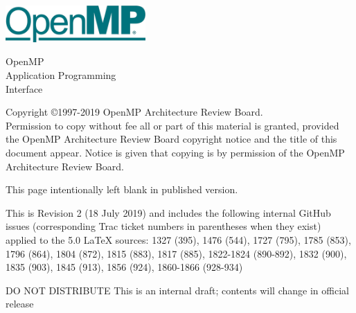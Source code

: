 
  \begin{titlepage}
    \begin{flushleft}
     \hspace{-6em} \includegraphics[width=0.4\textwidth]{openmp-logo.png}
    \end{flushleft}

    \begin{adjustwidth}{-0.75in}{0in}
    \begin{center}
      \Huge
      \textsf{OpenMP\\Application Programming\\Interface}

      \vspace{0.5in}\textsf{    }\vspace{-0.7in}
      \normalsize

      \vspace{1.0in}

      \textbf{\ompversion{}}
    \end{center}
    \end{adjustwidth}

    \vspace{3.0in}

\begin{adjustwidth}{0pt}{1em}\setlength{\parskip}{0.25\baselineskip}%
Copyright \copyright 1997-2019 OpenMP Architecture Review Board.\\
Permission to copy without fee all or part of this material is granted,
provided the OpenMP Architecture Review Board copyright notice and
the title of this document appear. Notice is given that copying is by
permission of the OpenMP Architecture Review Board.\end{adjustwidth}

  \end{titlepage}


\clearpage
\thispagestyle{empty}
\phantom{a}
This page intentionally left blank in published version.

This is Revision 2 (18 July 2019) and includes the following internal 
GitHub issues (corresponding Trac ticket numbers in parentheses when
they exist) applied to the 5.0 LaTeX sources: 1327 (395), 1476 (544), 
1727 (795), 1785 (853), 1796 (864), 1804 (872), 1815 (883), 1817 (885), 
1822-1824 (890-892), 1832 (900), 1835 (903), 1845 (913), 1856 (924), 
1860-1866 (928-934)

DO NOT DISTRIBUTE
This is an internal draft; contents will change in official release

\vfill

